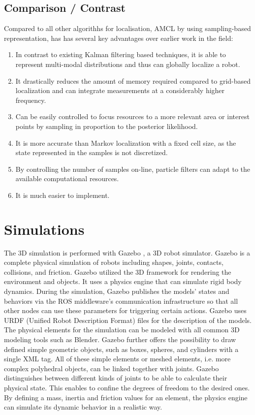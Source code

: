 \documentclass[10pt,journal,compsoc]{IEEEtran}
\begin{document}
    \subsection{Comparison / Contrast}
    Compared to all other algorithhs for localisation, AMCL by using sampling-based representation, has has
    several key advantages over earlier work in the field:
    \begin{enumerate}
        \item In contrast to existing Kalman filtering based techniques, it is able to represent multi-modal distributions and thus can globally localize a robot.
        \item It  drastically  reduces  the  amount  of  memory  required compared to grid-based localization and can integrate measurements at a considerably higher frequency.
        \item Can be easily controlled to focus resources to a more relevant area or interest points by sampling in proportion to the posterior likelihood.
        \item It is more accurate than Markov localization with a fixed cell size, as the state represented in  the samples is not discretized.
        \item By controlling the number of samples on-line, particle filters can adapt to the available computational resources.
        \item It is much easier to implement.
    \end {enumerate}

    \section{Simulations}
    The 3D simulation is performed with Gazebo , a 3D robot simulator. Gazebo is a complete physical simulation of robots including shapes, joints, contacts, collisions, and friction. Gazebo utilized the 3D framework for rendering the environment and objects.  It uses a physics engine that can simulate rigid body  dynamics. During the simulation, Gazebo publishes the models’ states and behaviors via the ROS middleware’s communication infrastructure so that all other nodes can use these parameters for triggering certain actions. Gazebo  uses  URDF  (Unified  Robot  Description  Format) files for the description of the models. The physical elements for the simulation can be modeled with all common 3D modeling tools such as Blender. Gazebo further offers the possibility to draw defined simple geometric objects, such as boxes, spheres, and cylinders  with  a  single  XML  tag.   All  of  these  simple  elements  or  meshed  elements,  i.e.  more complex  polyhedral objects, can be linked together with joints. Gazebo distinguishes between different kinds of joints to be able to calculate their physical state. This enables to confine the degrees of freedom to the desired ones. By defining a mass, inertia and friction values for an element, the physics engine can simulate its dynamic behavior in a realistic way.
\end{document}
